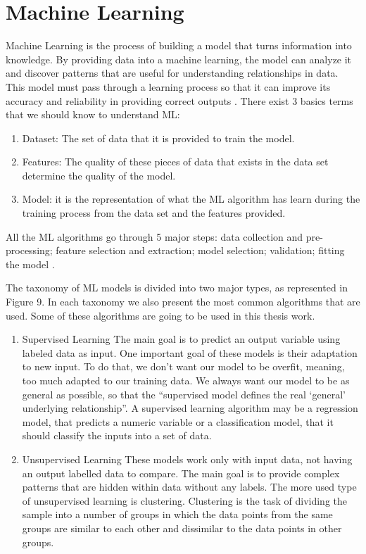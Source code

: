 \section{Machine Learning} 
\label{sub:if_you_use_this_template} 

Machine Learning is the process of building a model that turns information into knowledge. By providing data into a machine learning, the model can analyze it and discover patterns that are useful for understanding relationships in data. This model must pass through a learning process so that it can improve its accuracy and reliability in providing correct outputs \cite{OLD_15_WIND} \cite{46_ML}.
There exist 3 basics terms that we should know to understand ML:

\begin{enumerate}
    \item 
Dataset: The set of data that it is provided to train the model.
    \item
Features: The quality of these pieces of data that exists in the data set determine the quality of the model.
    \item
Model: it is the representation of what the ML algorithm has learn during the training process from the data set and the features provided.
\end{enumerate}

All the ML algorithms go through 5 major steps: data collection and pre-processing; feature selection and extraction; model selection; validation; fitting the model \cite{OLD_15_WIND} \cite{46_ML}.


The taxonomy of ML models is divided into two major types, as represented in Figure 9. In each taxonomy we also present the most common algorithms that are used. Some of these algorithms are going to be used in this thesis work.

\begin{enumerate}
    \item{Supervised Learning}
The main goal is to predict an output variable using labeled data as input. One important goal of these models is their adaptation to new input. To do that, we don’t want our model to be overfit, meaning, too much adapted to our training data. We always want our model to be as general as possible, so that the “supervised model defines the real ‘general’ underlying relationship”. A supervised learning algorithm may be a regression model, that predicts a numeric variable or a classification model, that it should classify the inputs into a set of data.

    \item{Unsupervised Learning}
These models work only with input data, not having an output labelled data to compare. The main goal is to provide complex patterns that are hidden within data without any labels. The more used type of unsupervised learning is clustering. Clustering is the task of dividing the sample into a number of groups in which the data points from the same groups are similar to each other and dissimilar to the data points in other groups.
\end{enumerate}

